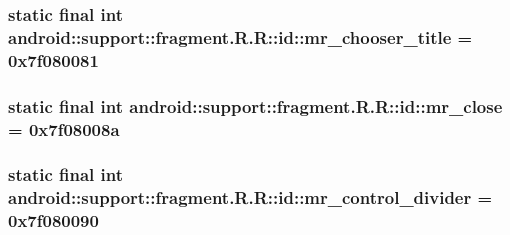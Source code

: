 \hypertarget{classandroid_1_1support_1_1fragment_1_1_r_1_1id_78640bfb63b8234139235afb536b801e}{
\subsubsection[{mr\_\-chooser\_\-title}]{\setlength{\rightskip}{0pt plus 5cm}static final int android::support::fragment.R.R::id::mr\_\-chooser\_\-title = 0x7f080081}}
\label{classandroid_1_1support_1_1fragment_1_1_r_1_1id_78640bfb63b8234139235afb536b801e}


\hypertarget{classandroid_1_1support_1_1fragment_1_1_r_1_1id_c89c5c322c05a780d7e04c3293414f77}{
\subsubsection[{mr\_\-close}]{\setlength{\rightskip}{0pt plus 5cm}static final int android::support::fragment.R.R::id::mr\_\-close = 0x7f08008a}}
\label{classandroid_1_1support_1_1fragment_1_1_r_1_1id_c89c5c322c05a780d7e04c3293414f77}


\hypertarget{classandroid_1_1support_1_1fragment_1_1_r_1_1id_713b02e0b4029aab52d519b7860240f7}{
\subsubsection[{mr\_\-control\_\-divider}]{\setlength{\rightskip}{0pt plus 5cm}static final int android::support::fragment.R.R::id::mr\_\-control\_\-divider = 0x7f080090}}
\label{classandroid_1_1support_1_1fragment_1_1_r_1_1id_713b02e0b4029aab52d519b7860240f7}


